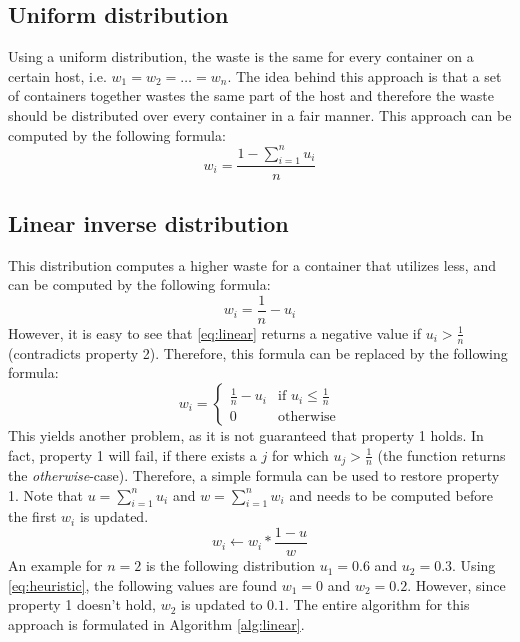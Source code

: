 \subsection{Uniform distribution} \label{sec:equal}
Using a uniform distribution, the waste is the same for every container on a certain host, i.e. $w_1 = w_2 = \dots = w_n$. The idea behind this approach is that a set of containers together wastes the same part of the host and therefore the waste should be distributed over every container in a fair manner. This approach can be computed by the following formula:
\begin{equation}
w_i = \frac{1 - \sum_{i=1}^n u_i}{n}
\end{equation}

\subsection{Linear inverse distribution} \label{sec:linear}
This distribution computes a higher waste for a container that utilizes less, and can be computed by the following formula:
\begin{equation} \label{eq:linear}
w_i = \frac{1}{n} - u_i
\end{equation}
However, it is easy to see that \autoref{eq:linear} returns a negative value if $u_i > \frac{1}{n}$ (contradicts property 2). Therefore, this formula can be replaced by the following formula:
\begin{equation}\label{eq:heuristic}
w_i = \begin{cases}
\frac{1}{n} - u_i & \text{if } u_i \leq \frac{1}{n}\\
0                 & \text{otherwise}
\end{cases}
\end{equation}
This yields another problem, as it is not guaranteed that property 1 holds. In fact, property 1 will fail, if there exists a $j$ for which $u_j > \frac{1}{n}$ (the function returns the \textit{otherwise}-case). Therefore, a simple formula can be used to restore property 1. Note that $u = \sum_{i=1}^n u_i$ and $w = \sum_{i=1}^n w_i$ and needs to be computed before the first $w_i$ is updated.
\begin{equation} \label{eq:update}
w_i \leftarrow w_i * \frac{1-u}{w}
\end{equation}
An example for $n = 2$ is the following distribution $u_1 = 0.6$ and $u_2 = 0.3$. Using \autoref{eq:heuristic}, the following values are found $w_1 = 0$ and $w_2 = 0.2$. However, since property 1 doesn't hold, $w_2$ is updated to $0.1$. The entire algorithm for this approach is formulated in Algorithm \ref{alg:linear}.

